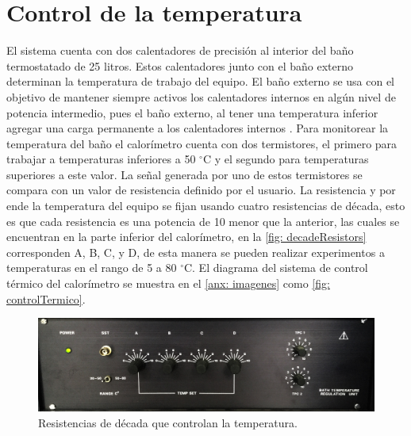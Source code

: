 
%


\newcommand{\grad}[0]{$^\circ$C}


\chapter{Control de la temperatura}
	El sistema cuenta con dos calentadores de precisión al interior del baño termostatado de 25 litros. Estos calentadores junto con el ba\~no externo determinan la temperatura de trabajo del equipo. El ba\~no externo se usa con el objetivo de mantener siempre activos los calentadores internos en alg\'un nivel de potencia intermedio, pues el ba\~no externo, al tener una temperatura inferior agregar una carga permanente a los calentadores internos \cite{Suurkuusk}. Para monitorear la temperatura del ba\~no el calor\'imetro cuenta con dos termistores, el primero para trabajar a temperaturas inferiores a 50 \grad{} y el segundo para temperaturas superiores a este valor. La se\~nal generada por uno de estos termistores se compara con un valor de resistencia definido por el usuario. La resistencia y por ende la temperatura del equipo se fijan usando cuatro resistencias de década, esto es que cada resistencia es una potencia de 10 menor que la anterior, las cuales se encuentran en la parte inferior del calor\'imetro, en la \autoref{fig: decadeResistors} corresponden A, B, C, y D, de esta manera se pueden realizar experimentos a temperaturas en el rango de 5 a 80 \grad{}. El diagrama del sistema de control t\'ermico del calor\'imetro se muestra en el \autoref{anx: imagenes} como \autoref{fig: controlTermico}.
	
	\begin{figure}[h]
		\centering
		\includegraphics[width=0.7\linewidth]{Figures/decadeResistors}
		\caption{Resistencias de década que controlan la temperatura.}
		\label{fig: decadeResistors}
	\end{figure}
	
